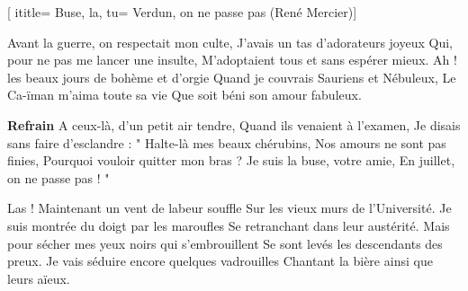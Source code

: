 [
ititle= {Buse, la},
tu={ Verdun, on ne passe pas (René Mercier)}]

\beginverse
Avant la guerre, on respectait mon culte,
J'avais un tas d'adorateurs joyeux
Qui, pour ne pas me lancer une insulte,
M'adoptaient tous et sans espérer mieux.
Ah ! les beaux jours de bohème et d'orgie
Quand je couvrais Sauriens et Nébuleux,
Le Ca-ïman m'aima toute sa vie
Que soit béni son amour fabuleux.
\endverse

\beginchorus
\textbf {Refrain}
A ceux-là, d'un petit air tendre,
Quand ils venaient à l'examen,
Je disais sans faire d'esclandre :
" Halte-là mes beaux chérubins,
Nos amours ne sont pas finies,
Pourquoi vouloir quitter mon bras ?
Je suis la buse, votre amie,
En juillet, on ne passe pas ! "
\endchorus

\beginverse
Las ! Maintenant un vent de labeur souffle
Sur les vieux murs de l'Université.
Je suis montrée du doigt par les maroufles
Se retranchant dans leur austérité.
Mais pour sécher mes yeux noirs qui s'embrouillent
Se sont levés les descendants des preux.
Je vais séduire encore quelques vadrouilles
Chantant la bière ainsi que leurs aïeux.
\endverse

\endsong